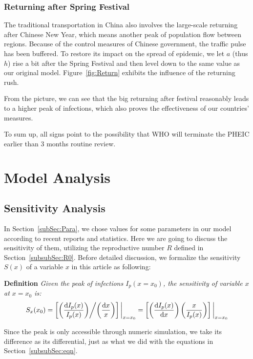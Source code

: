 \documentclass[12pt]{mcmthesis}
\begin{document}
\subsubsection{Returning after Spring Festival}
The traditional transportation in China also involves the large-scale returning after Chinese New Year, which means another peak of population flow between regions. Because of the control measures of Chinese government, the traffic pulse has been buffered. To restore its impact on the spread of epidemic, we let $a$ (thus $h$) rise a bit after the Spring Festival and then level down to the same value as our original model. Figure~\ref{fig:Return} exhibits the influence of the returning rush.

From the picture, we can see that the big returning after festival reasonably leads to a higher peak of infections, which also proves the effectiveness of our countries' measures.

To sum up, all signs point to the possibility that WHO will terminate the PHEIC earlier than 3 months routine review.

\section{Model Analysis} \label{Sec:analysis}
\subsection{Sensitivity Analysis}
In Section~\ref{subSec:Para}, we chose values for some parameters in our model according to recent reports and statistics. Here we are going to discuss the sensitivity of them, utilizing the reproductive number $R$ defined in Section~\ref{subsubSec:R0}. Before detailed discussion, we formalize the sensitivity $S(x)$ of a variable $x$ in this article as following:

\textbf{Definition} \textit{Given the peak of infections $I_p(x = x_0)$, the sensitivity of variable $x$ at $x = x_0$ is:}
\begin{equation*}
S_x(x_0) = \left[\left(\frac{{\rm d}I_p(x)}{I_p(x)}\right) \middle/ \left(\frac{{\rm d}x}{x}\right)\right]\bigg|_{x = x_0} = \left[\left(\frac{{\rm d}I_p(x)}{{\rm d}x}\right)\left(\frac{x}{I_p(x)}\right)\right]\bigg|_{x = x_0}
\end{equation*}

Since the peak is only accessible through numeric simulation, we take its difference as its differential, just as what we did with the equations in Section~\ref{subsubSec:eqn}.
\end{document}
